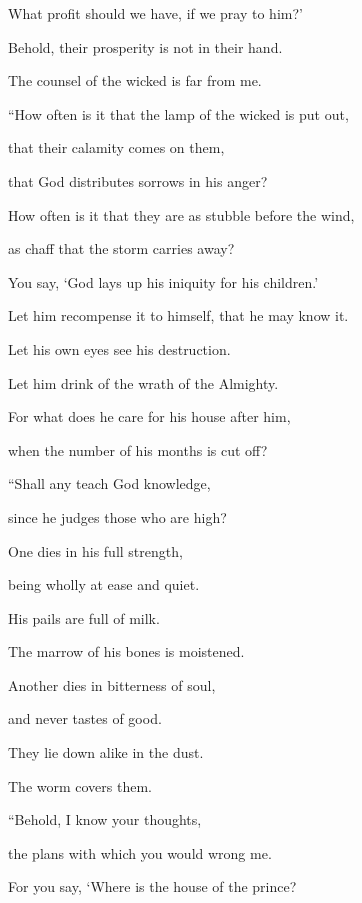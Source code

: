 {\par }{\QB What profit should we have, if we pray to him?’
\par }{\Q {}Behold, their prosperity is not in their hand.
\par }{\QB The counsel of the wicked is far from me.
\par }{\BB \par }{\Q {}“How often is it that the lamp of the wicked is put out,
\par }{\QB that their calamity comes on them,
\par }{\QB that God distributes sorrows in his anger?
\par }{\Q {}How often is it that they are as stubble before the wind,
\par }{\QB as chaff that the storm carries away?
\par }{\Q {}You say, ‘God lays up his iniquity for his children.’
\par }{\QB Let him recompense it to himself, that he may know it.
\par }{\Q {}Let his own eyes see his destruction.
\par }{\QB Let him drink of the wrath of the Almighty.
\par }{\Q {}For what does he care for his house after him,
\par }{\QB when the number of his months is cut off?
\par }{\BB \par }{\Q {}“Shall any teach God knowledge,
\par }{\QB since he judges those who are high?
\par }{\Q {}One dies in his full strength,
\par }{\QB being wholly at ease and quiet.
\par }{\Q {}His pails are full of milk.
\par }{\QB The marrow of his bones is moistened.
\par }{\Q {}Another dies in bitterness of soul,
\par }{\QB and never tastes of good.
\par }{\Q {}They lie down alike in the dust.
\par }{\QB The worm covers them.
\par }{\BB \par }{\Q {}“Behold, I know your thoughts,
\par }{\QB the plans with which you would wrong me.
\par }{\Q {}For you say, ‘Where is the house of the prince?
}
